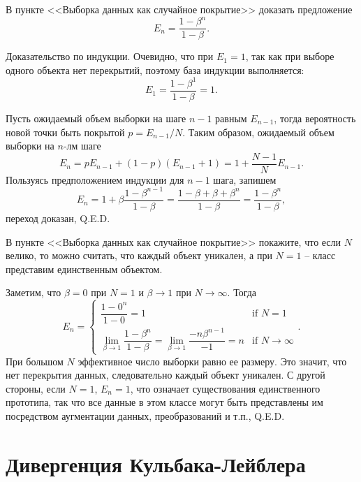 \begin{problem}
    В пункте <<Выборка данных как случайное покрытие>>  доказать предложение
    \[
        E_n=\dfrac{1-\beta^n}{1-\beta}.
    \]
\end{problem}

\begin{solution}
    Доказательство по индукции. Очевидно, что при $E_1=1$, так как при выборе одного объекта нет перекрытий, поэтому база индукции выполняется:
    \[
        E_1=\dfrac{1-\beta^1}{1-\beta}=1.
    \]

    Пусть ожидаемый объем выборки на шаге $n-1$ равным $E_{n-1}$, тогда вероятность новой точки быть покрытой $p=E_{n-1}/N$. Таким образом, ожидаемый объем выборки на $n$-лм шаге
    \[
        E_n=pE_{n-1}+(1-p)(E_{n-1}+1)=1+\dfrac{N-1}{N}E_{n-1}.
    \]
    Пользуясь предположением индукции для $n-1$ шага, запишем
    \[
        E_n=1+\beta\dfrac{1-\beta^{n-1}}{1-\beta}=\dfrac{1-\beta+\beta+\beta^{n}}{1-\beta}=\dfrac{1-\beta^{n}}{1-\beta},
    \]
    переход доказан, Q.E.D.
\end{solution}

\begin{problem}
    В пункте <<Выборка данных как случайное покрытие>>  покажите, что если $N$ велико, то можно считать, что каждый объект уникален, а при $N=1$ -- класс представим единственным объектом.
\end{problem}

\begin{solution}
    Заметим, что $\beta=0$ при $N=1$ и $\beta \to 1$ при $N \to \infty$. Тогда
    \[
        E_n=\begin{cases}
            \dfrac{1-0^n}{1-0}=1 & \text{if } N=1 \\
            \lim\limits_{\beta \to 1}\dfrac{1-\beta^n}{1-\beta}=\lim\limits_{\beta \to 1}\dfrac{-n\beta^{n-1}}{-1}=n & \text{if } N \to \infty
        \end{cases}.
    \]
    При большом $N$ эффективное число выборки равно ее размеру. Это значит, что нет перекрытия данных, следовательно каждый объект уникален. С другой стороны, если $N=1$, $E_n=1$, что означает существования единственного прототипа, так что все данные в этом классе могут быть представлены им посредством аугментации данных, преобразований и т.п., Q.E.D.
\end{solution}


\section*{Дивергенция Кульбака-Лейблера}

